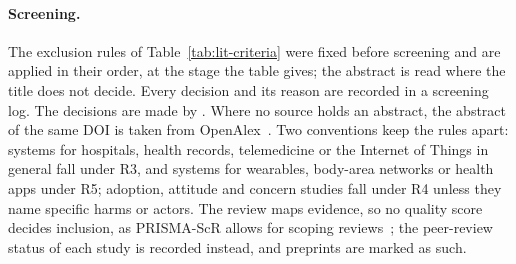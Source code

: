 \paragraph{Screening.} The exclusion rules of Table~\ref{tab:lit-criteria} were
fixed before screening and are applied in their order, at the stage the table
gives; the abstract is read where the title does not decide. Every decision and
its reason are recorded in a screening log. The decisions are made by
\highlight[orange!25]{\textbf{[?]}}.
Where no source holds an abstract, the abstract of the same DOI is taken from
OpenAlex~\parencite{priem2022openalex}. Two conventions keep the rules apart:
systems for hospitals, health records, telemedicine or the Internet of Things
in general fall under R3, and systems for wearables, body-area networks or
health apps under R5; adoption, attitude and concern studies fall under R4
unless they name specific harms or actors. The review maps evidence, so no quality
score decides inclusion, as PRISMA-ScR allows for scoping
reviews~\parencite{tricco2018prisma}; the peer-review status of each study is
recorded instead, and preprints are marked as such.

